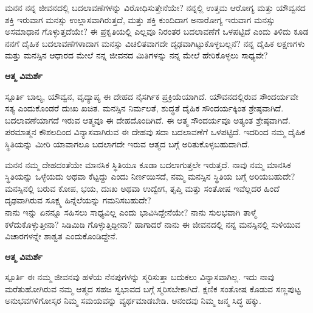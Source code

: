 \newpage
\begin{mananam}{\kanfont ಮನನ}
\footnotesize \mananamfont ನನ್ನ ಜೀವನದಲ್ಲಿ ಬದಲಾವಣೆಗಳನ್ನು ವಿರೋಧಿಸುತ್ತೇನೆಯೇ? ನನ್ನಲ್ಲಿ ಉತ್ತಮ ಆರೋಗ್ಯ ಮತ್ತು ಯೌವ್ವನದ ಶಕ್ತಿ ಇರುವಾಗ ಮನಸ್ಸು ಉಲ್ಲಾಸವಾಗಿರುತ್ತದೆ, ಮತ್ತು ಶಕ್ತಿ ಕುಂದಿದಾಗ ಅನಾರೋಗ್ಯ ಇರುವಾಗ ಮನಸ್ಸು ಅಸಮಾಧಾನ ಗೊಳ್ಳುತ್ತದೆಯೇ? ಈ ಪ್ರಕೃತಿಯಲ್ಲಿ ಎಲ್ಲವೂ ನಿರಂತರ ಬದಲಾವಣೆಗೆ ಒಳಪಟ್ಟಿದೆ ಎಂದು ತಿಳಿದು ಕೂಡ ನನಗೆ ದೈಹಿಕ ಬದಲಾವಣೆಗಳಾದಾಗ ಮನಸ್ಸು ವಿಚಲಿತವಾಗದೇ ದೃಢವಾಗಿಟ್ಟುಕೊಳ್ಳಬಲ್ಲನೆ? ನನ್ನ ದೈಹಿಕ ಲಕ್ಷಣಗಳು ಮತ್ತು ಮನಸ್ಸಿನ ಆಧಾರದ ಮೇಲೆ ನನ್ನ ಜೀವನದ ಮಿತಿಗಳನ್ನು ನನ್ನ ಮೇಲೆ ಹೇರಿಕೊಳ್ಳಲು ಸಾಧ್ಯವೇ?
\end{mananam}
\WritingHand\enspace\textbf{ಆತ್ಮ ವಿಮರ್ಶೆ}
\begin{inspiration}{\kanfont ಸ್ಪೂರ್ತಿ}
\footnotesize \mananamfont ಬಾಲ್ಯ, ಯೌವ್ವನ, ವೃದ್ಯಾಪ್ಯ ಈ ದೇಹದ ನೈಸರ್ಗಿಕ ಪ್ರಕ್ರಿಯೆಯಾಗಿದೆ. ಯೌವನದಲ್ಲಿರುವ ಸೌಂದರ್ಯವೇ ಸತ್ಯ ಎಂದುಕೊಂಡರೆ ದುಃಖ ಖಚಿತ. ಮನಸ್ಸಿನ ನಿರ್ಮಲತೆ, ಶುದ್ಧತೆ ದೈಹಿಕ ಸೌಂದರ್ಯಕ್ಕಿಂತ ಶ್ರೇಷ್ಠವಾಗಿದೆ. ಬದಲಾವಣೆಯಾಗದೆ ಇರುವ ಆತ್ಮವೂ ಈ ದೇಹದೊಂದಿಗಿದೆ. ಈ ಆತ್ಮ ಸೌಂದರ್ಯವೂ ಅತ್ಯಂತ ಶ್ರೇಷ್ಠವಾಗಿದೆ. ಪರಮಾತ್ಮನ ಕೌಶಲದಿಂದ ವಿನ್ಯಾಸವಾಗಿರುವ ಈ ದೇಹವು ಸದಾ ಬದಲಾವಣೆಗೆ ಒಳಪಟ್ಟಿದೆ. ಇದರಿಂದ ನಮ್ಮ ದೈಹಿಕ ಸ್ಥಿತಿಯನ್ನು ಮೀರಿ ಯಾವಾಗಲೂ ಬದಲಾಗದೇ ಇರುವ ಆತ್ಮದ ಬಗ್ಗೆ ಅರಿತುಕೊಳ್ಳಬಹುದಾಗಿದೆ.
\end{inspiration}
\newpage


\newpage
\begin{mananam}{\kanfont ಮನನ}
\footnotesize \mananamfont ನಮ್ಮ ದೇಹದಂತೆಯೇ ಮಾನಸಿಕ ಸ್ಥಿತಿಯೂ ಕೂಡಾ ಬದಲಾಗುತ್ತಲೇ ಇರುತ್ತದೆ. ನಾವು ನಮ್ಮ ಮಾನಸಿಕ ಸ್ಥಿತಿಯನ್ನು ಒಳ್ಳೆಯದು ಅಥವಾ ಕೆಟ್ಟದ್ದು ಎಂದು ನಿರ್ಣಯಿಸದೆ, ನಮ್ಮ ಮನಸ್ಸಿನ ಸ್ಥಿತಿಯ ಬಗ್ಗೆ ಅರಿಯಬಹುದೇ? ಮನಸ್ಸಿನಲ್ಲಿ ಬರುವ ಕೋಪ, ಭಯ, ದುಃಖ ಅಥವಾ ಉದ್ವೇಗ, ತೃಪ್ತಿ ಮತ್ತು ಸಂತೋಷ ಇವೆಲ್ಲದರ ಹಿಂದೆ ದೃಢವಾಗಿರುವ ಸೂಕ್ಷ್ಮ ಹಿನ್ನೆಲೆಯನ್ನು  ಗಮನಿಸಬಹುದೇ?\\
ನಾನು ಇನ್ನು ಏನನ್ನೂ ಸಹಿಸಲು ಸಾಧ್ಯವಿಲ್ಲ ಎಂದು ಭಾವಿಸಿದ್ದೇನೆಯೇ? ನಾನು ಸುಲಭವಾಗಿ ತಾಳ್ಮೆ ಕಳೆದುಕೊಳ್ಳುತ್ತೀನಾ? ಸಿಡಿಮಿಡಿ ಗೊಳ್ಳುತ್ತಿದ್ದೀನಾ?  ಹಾಗಾದರೆ ನಾನು ಈ ಜೀವನದಲ್ಲಿ ನನ್ನ ಮನಸ್ಸಿನಲ್ಲಿ ಸುಳಿಯುವ ವಿಚಾರಗಳನ್ನೇ ಶಾಶ್ವತ ಎಂದುಕೊಂಡಿದ್ದೇನೆ.
\end{mananam}
\WritingHand\enspace\textbf{ಆತ್ಮ ವಿಮರ್ಶೆ}
\begin{inspiration}{\kanfont ಸ್ಪೂರ್ತಿ}
\footnotesize \mananamfont ಈ ನಮ್ಮ ಜೀವನವು ಹಳೆಯ ನೆನಪುಗಳನ್ನು ಸ್ಮರಿಸುತ್ತಾ ಬದುಕಲು ವಿನ್ಯಾಸವಾಗಿಲ್ಲ. ಇದು ನಾವು ಮರೆತುಹೋಗಿರುವ ನಮ್ಮ ಆತ್ಮದ ಸಹಜ ಸ್ವಭಾವದ ಬಗ್ಗೆ ಸ್ಮರಿಸಬೇಕಾಗಿದೆ. ಕ್ಷಣಿಕ ಸಂತೋಷ ಕೊಡುವ ಸಣ್ಣಪುಟ್ಟ ಅನುಭವಗಳಿಗೋಸ್ಕರ ನಿಮ್ಮ ಸಮಯವನ್ನು ವ್ಯರ್ಥಮಾಡಬೇಡಿ.  ಆನಂದವು ನಿಮ್ಮ ಜನ್ಮ ಸಿದ್ಧ ಹಕ್ಕು.
\end{inspiration}
\newpage

